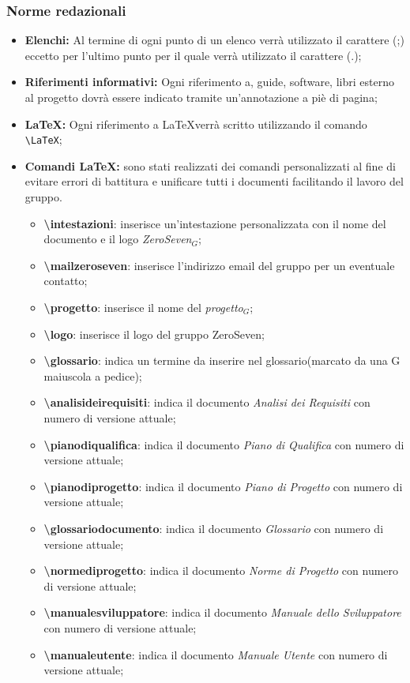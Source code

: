 \subsubsection{Norme redazionali} 
\label{NormeRedazionali}
\begin{itemize}
	\item \textbf{Elenchi:} Al termine di ogni punto di un elenco verrà utilizzato il carattere (;) eccetto per l'ultimo punto per il quale verrà utilizzato il carattere (.);
	\item \textbf{Riferimenti informativi:} Ogni riferimento a, guide, software,
	libri esterno al progetto dovrà essere indicato tramite un’annotazione a piè di pagina;
	\item \textbf{\LaTeX:} Ogni riferimento a \LaTeX verrà scritto utilizzando il comando \texttt{\textbackslash LaTeX};
	\item \textbf{Comandi \LaTeX:} sono stati realizzati dei comandi personalizzati al fine di evitare errori di battitura e unificare tutti i documenti facilitando il lavoro del gruppo.
	\begin{itemize}
		\item \textbf{ \textbackslash intestazioni}: inserisce un'intestazione personalizzata con il nome del documento e il logo \textit{ZeroSeven$_{G}$};
		\item \textbf{ \textbackslash mailzeroseven}: inserisce l'indirizzo email del gruppo per un eventuale contatto;
		\item \textbf{ \textbackslash progetto}: inserisce il nome del \textit{progetto$_{G}$};
		\item \textbf{ \textbackslash logo}: inserisce il logo del gruppo ZeroSeven;
		\item \textbf{ \textbackslash glossario}: indica un termine da inserire nel glossario(marcato da una G maiuscola a pedice);
		\item \textbf{\textbackslash analisideirequisiti}: indica il documento \textit{Analisi dei Requisiti} con numero di versione attuale;
		\item \textbf{\textbackslash pianodiqualifica}: indica il documento \textit{Piano di Qualifica} con numero di versione attuale;
		\item \textbf{\textbackslash pianodiprogetto}: indica il documento \textit{Piano di Progetto} con numero di versione attuale;
		\item \textbf{\textbackslash glossariodocumento}: indica il documento \textit{Glossario} con numero di versione attuale;
		\item \textbf{\textbackslash normediprogetto}: indica il documento \textit{Norme di Progetto} con numero di versione attuale;
		\item \textbf{\textbackslash manualesviluppatore}: indica il documento \textit{Manuale dello Sviluppatore} con numero di versione attuale;
		\item \textbf{\textbackslash manualeutente}: indica il documento \textit{Manuale Utente} con numero di versione attuale;
	\end{itemize}
	

\end{itemize}
